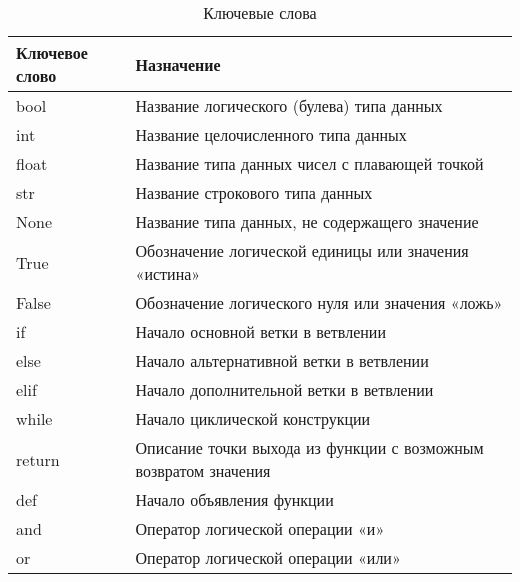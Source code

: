 \begin{table}[h]
    \centering
    \caption{Ключевые слова}
    \label{tab:python_keywords}
    \begin{tabular}{>{\ttfamily}l p{10cm}}
        \toprule
        \textrm{\normalfont Ключевое слово} & \textrm{\normalfont Назначение}                                 \\
        \midrule
        bool                                & Название логического (булева) типа данных                       \\
        int                                 & Название целочисленного типа данных                             \\
        float                               & Название типа данных чисел с плавающей точкой                   \\
        str                                 & Название строкового типа данных                                 \\
        None                                & Название типа данных, не содержащего значение                   \\
        True                                & Обозначение логической единицы или значения «истина»            \\
        False                               & Обозначение логического нуля или значения «ложь»                \\
        if                                  & Начало основной ветки в ветвлении                               \\
        else                                & Начало альтернативной ветки в ветвлении                         \\
        elif                                & Начало дополнительной ветки в ветвлении                         \\
        while                               & Начало циклической конструкции                                  \\
        return                              & Описание точки выхода из функции с возможным возвратом значения \\
        def                                 & Начало объявления функции                                       \\
        and                                 & Оператор логической операции «и»                                \\
        or                                  & Оператор логической операции «или»                              \\
        \bottomrule
    \end{tabular}
\end{table}

